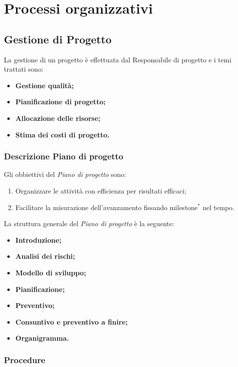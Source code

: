 \documentclass[11pt,a4paper]{article}
\begin{document}
{	\section{Processi organizzativi}
	
	\subsection{Gestione di Progetto}
	La gestione di un progetto è effettuata dal Responsabile di progetto e i temi trattati sono:
	\begin{itemize}
		\item \textbf{Gestione qualità;}
		\item \textbf{Pianificazione di progetto;}
		\item \textbf{Allocazione delle risorse;}
		\item \textbf{Stima dei costi di progetto.}
	\end{itemize}
	
	\subsubsection{Descrizione Piano di progetto}
	
	Gli obbiettivi del \textit{Piano di progetto} sono:
	
	\begin{enumerate}
		\item Organizzare le attività con efficienza per risultati efficaci;
		\item Facilitare la misurazione dell'avanzamento fissando milestone$^*$ nel tempo.
	\end{enumerate}
	
	La struttura generale del \textit{Piano di progetto} è la seguente:
	\begin{itemize}
		\item \textbf{Introduzione;}
		\item \textbf{Analisi dei rischi;}
		\item \textbf{Modello di sviluppo;}
		\item \textbf{Pianificazione;}
		\item \textbf{Preventivo;}
		\item \textbf{Consuntivo e preventivo a finire;}
		\item \textbf{Organigramma.}
	\end{itemize}
	
	\subsubsection{Procedure}
	
}
\end{document}
